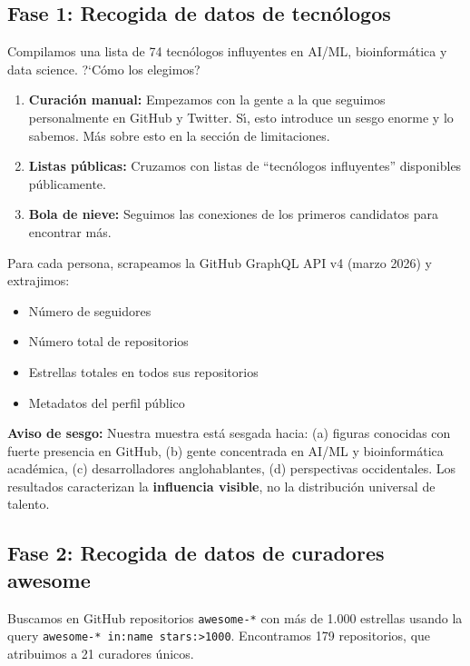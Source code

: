 \documentclass[11pt]{article}
\begin{document}
\subsection{Fase 1: Recogida de datos de tecn\'{o}logos}

Compilamos una lista de 74 tecn\'{o}logos influyentes en AI/ML, bioinform\'{a}tica y data science. ?`C\'{o}mo los elegimos?

\begin{enumerate}
    \item \textbf{Curaci\'{o}n manual:} Empezamos con la gente a la que seguimos personalmente en GitHub y Twitter. S\'{\i}, esto introduce un sesgo enorme y lo sabemos. M\'{a}s sobre esto en la secci\'{o}n de limitaciones.
    \item \textbf{Listas p\'{u}blicas:} Cruzamos con listas de ``tecn\'{o}logos influyentes'' disponibles p\'{u}blicamente.
    \item \textbf{Bola de nieve:} Seguimos las conexiones de los primeros candidatos para encontrar m\'{a}s.
\end{enumerate}

Para cada persona, scrapeamos la GitHub GraphQL API v4 (marzo 2026) y extrajimos:
\begin{itemize}
    \item N\'{u}mero de seguidores
    \item N\'{u}mero total de repositorios
    \item Estrellas totales en todos sus repositorios
    \item Metadatos del perfil p\'{u}blico
\end{itemize}

\textcolor{warnorange}{\textbf{Aviso de sesgo:}} Nuestra muestra est\'{a} sesgada hacia: (a) figuras conocidas con fuerte presencia en GitHub, (b) gente concentrada en AI/ML y bioinform\'{a}tica acad\'{e}mica, (c) desarrolladores anglohablantes, (d) perspectivas occidentales. Los resultados caracterizan la \textbf{influencia visible}, no la distribuci\'{o}n universal de talento.

\subsection{Fase 2: Recogida de datos de curadores awesome}

Buscamos en GitHub repositorios \texttt{awesome-*} con m\'{a}s de 1.000 estrellas usando la query \texttt{awesome-* in:name stars:>1000}. Encontramos 179 repositorios, que atribuimos a 21 curadores \'{u}nicos.
\end{document}
